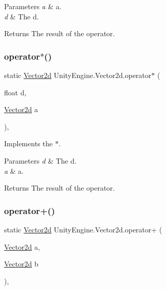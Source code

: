 \begin{DoxyParams}{Parameters}
{\em a} & a.\\
\hline
{\em d} & The d.\\
\hline
\end{DoxyParams}
\begin{DoxyReturn}{Returns}
The result of the operator.
\end{DoxyReturn}
\mbox{\label{struct_unity_engine_1_1_vector2d_afa5287efd4558c88ff2f063090b807df}} 
\subsubsection{\texorpdfstring{operator$\ast$()}{operator*()}\hspace{0.1cm}{\footnotesize\ttfamily [2/2]}}
{\footnotesize\ttfamily static \hyperlink{struct_unity_engine_1_1_vector2d}{Vector2d} Unity\+Engine.\+Vector2d.\+operator$\ast$ (\begin{DoxyParamCaption}\item[{float}]{d,  }\item[{\hyperlink{struct_unity_engine_1_1_vector2d}{Vector2d}}]{a }\end{DoxyParamCaption})\hspace{0.3cm}{\ttfamily [inline]}, {\ttfamily [static]}}



Implements the $\ast$. 


\begin{DoxyParams}{Parameters}
{\em d} & The d.\\
\hline
{\em a} & a.\\
\hline
\end{DoxyParams}
\begin{DoxyReturn}{Returns}
The result of the operator.
\end{DoxyReturn}
\mbox{\label{struct_unity_engine_1_1_vector2d_afdef6b104842871b883ad16abe0ca2a7}} 
\subsubsection{\texorpdfstring{operator+()}{operator+()}}
{\footnotesize\ttfamily static \hyperlink{struct_unity_engine_1_1_vector2d}{Vector2d} Unity\+Engine.\+Vector2d.\+operator+ (\begin{DoxyParamCaption}\item[{\hyperlink{struct_unity_engine_1_1_vector2d}{Vector2d}}]{a,  }\item[{\hyperlink{struct_unity_engine_1_1_vector2d}{Vector2d}}]{b }\end{DoxyParamCaption})\hspace{0.3cm}{\ttfamily [inline]}, {\ttfamily [static]}}



